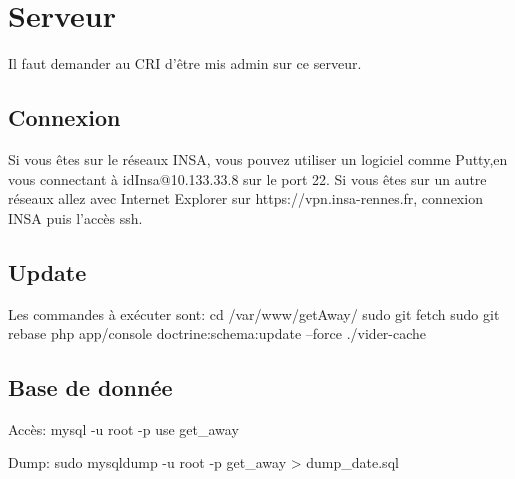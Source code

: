 \chapter{Serveur}
Il faut demander au CRI d'être mis admin sur ce serveur.
\section{Connexion}
Si vous êtes sur le réseaux INSA, vous pouvez utiliser un logiciel comme Putty,en vous connectant à idInsa@10.133.33.8 sur le port 22.
Si vous êtes sur un autre réseaux allez avec Internet Explorer sur https://vpn.insa-rennes.fr, connexion INSA puis l'accès ssh.

\section{Update}
Les commandes à exécuter sont:
cd /var/www/getAway/
sudo git fetch
sudo git rebase
php app/console doctrine:schema:update --force
./vider-cache

\section{Base de donnée}
Accès:
mysql -u root -p
use get\_away


Dump:
sudo mysqldump -u root -p get\_away > dump\_date.sql
